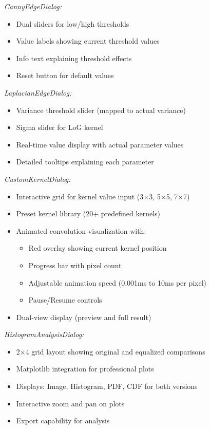 \documentclass[12pt,a4paper]{article}
\begin{document}
\textit{CannyEdgeDialog:}
\begin{itemize}
    \item Dual sliders for low/high thresholds
    \item Value labels showing current threshold values
    \item Info text explaining threshold effects
    \item Reset button for default values
\end{itemize}

\textit{LaplacianEdgeDialog:}
\begin{itemize}
    \item Variance threshold slider (mapped to actual variance)
    \item Sigma slider for LoG kernel
    \item Real-time value display with actual parameter values
    \item Detailed tooltips explaining each parameter
\end{itemize}

\textit{CustomKernelDialog:}
\begin{itemize}
    \item Interactive grid for kernel value input (3×3, 5×5, 7×7)
    \item Preset kernel library (20+ predefined kernels)
    \item Animated convolution visualization with:
    \begin{itemize}
        \item Red overlay showing current kernel position
        \item Progress bar with pixel count
        \item Adjustable animation speed (0.001ms to 10ms per pixel)
        \item Pause/Resume controls
    \end{itemize}
    \item Dual-view display (preview and full result)
\end{itemize}

\textit{HistogramAnalysisDialog:}
\begin{itemize}
    \item 2×4 grid layout showing original and equalized comparisons
    \item Matplotlib integration for professional plots
    \item Displays: Image, Histogram, PDF, CDF for both versions
    \item Interactive zoom and pan on plots
    \item Export capability for analysis
\end{itemize}
\end{document}
